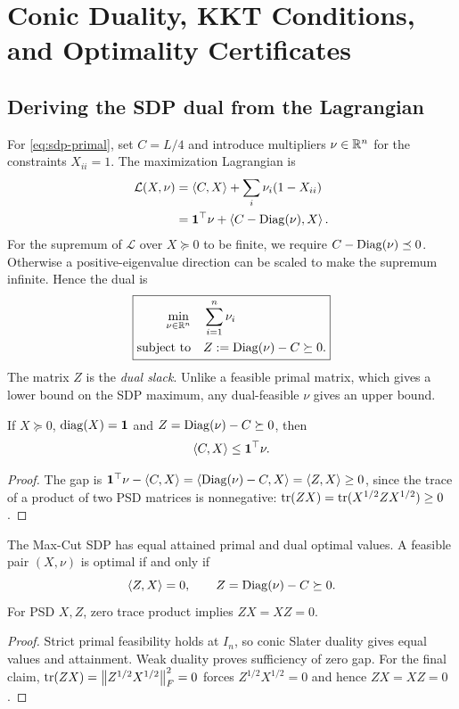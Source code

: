 \chapter{Conic Duality, KKT Conditions, and Optimality Certificates}\label{ch:dual}
\section{Deriving the SDP dual from the Lagrangian}
For \eqref{eq:sdp-primal}, set $C=L/4$ and introduce multipliers $\nu\in\mathbb{R}^n$ for the constraints $X_{ii}=1$. The maximization Lagrangian is
\begin{align}
\mathcal L(X,\nu)&=\left\langle C,X\right\rangle+\sum_i\nu_i(1-X_{ii})\\
&=\boldsymbol{1}^\top\nu+\left\langle C-\operatorname{Diag}(\nu),X\right\rangle.
\end{align}
For the supremum of $\mathcal L$ over $X\succeq0$ to be finite, we require $C-\operatorname{Diag}(\nu)\preceq0$. Otherwise a positive-eigenvalue direction can be scaled to make the supremum infinite. Hence the dual is
\begin{equation}\label{eq:sdp-dual}
\boxed{\begin{aligned}
\min_{\nu\in\mathbb{R}^n}\quad &\sum_{i=1}^n\nu_i\\
\text{subject to}\quad &Z:=\operatorname{Diag}(\nu)-C\succeq0.
\end{aligned}}
\end{equation}
The matrix $Z$ is the \emph{dual slack}. Unlike a feasible primal matrix, which gives a lower bound on the SDP maximum, any dual-feasible $\nu$ gives an upper bound.

\begin{theorem}\label{thm:weak}
If $X\succeq0$, $\operatorname{diag}(X)=\boldsymbol{1}$ and $Z=\operatorname{Diag}(\nu)-C\succeq0$, then
\[
\left\langle C,X\right\rangle\le\boldsymbol{1}^\top\nu.
\]
\end{theorem}
\begin{proof}
The gap is $\boldsymbol{1}^\top\nu-\left\langle C,X\right\rangle=\left\langle \operatorname{Diag}(\nu)-C,X\right\rangle=\left\langle Z,X\right\rangle\ge0$, since the trace of a product of two PSD matrices is nonnegative: $\operatorname{tr}(ZX)=\operatorname{tr}(X^{1/2}ZX^{1/2})\ge0$.
\end{proof}

\begin{theorem}\label{thm:strong}
The Max-Cut SDP has equal attained primal and dual optimal values. A feasible pair $(X,\nu)$ is optimal if and only if
\begin{equation}\label{eq:complementarity}
\left\langle Z,X\right\rangle=0,\qquad Z=\operatorname{Diag}(\nu)-C\succeq0.
\end{equation}
For PSD $X,Z$, zero trace product implies $ZX=XZ=0$.
\end{theorem}
\begin{proof}
Strict primal feasibility holds at $I_n$, so conic Slater duality gives equal values and attainment. Weak duality proves sufficiency of zero gap. For the final claim, $\operatorname{tr}(ZX)=\left\lVert Z^{1/2}X^{1/2}\right\rVert_F^2=0$ forces $Z^{1/2}X^{1/2}=0$ and hence $ZX=XZ=0$.
\end{proof}

